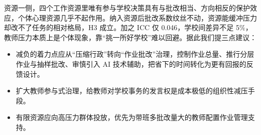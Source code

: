 \documentclass[zihao = -4, linespread = 1.5]{article}
\begin{document}
资源一侧，四个工作资源里唯有参与学校决策具有与批改相当、方向相反的保护效应，个体心理资源几乎不起作用。纳入资源后批改系数纹丝不动，资源能缓冲压力却改不了任务的相对格局，H3 成立。加之 ICC 仅 0.046，学校间差异不足 5\%，教师压力本质上是个体现象，靠“挑一所好学校”难以回避。据此我们提三点建议：

\begin{itemize}
    \item[$\bigstar$] 减负的着力点应从“压缩行政”转向“作业批改”治理，控制作业总量、推行分层作业与抽样批改、审慎引入 AI 技术辅助，把省下的时间转化为更有回报的反馈设计。
    \item[$\bigstar$] 扩大教师参与式治理，给教师对学校事务的发言权是成本极低的组织性减压手段。
    \item[$\bigstar$] 有限资源应向高压力群体投放，优先为带班多批改量大的教师配置作业管理支持。
\end{itemize}



\clearpage
\cfoot{}
\setlength{\bibhang}{2em}
\renewcommand{\refname}{}
\centerline{\bfseries{}}
\vspace*{-3em}
\end{document}
